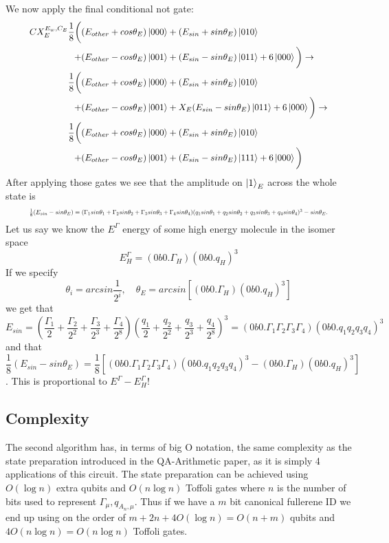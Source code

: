 \documentclass{article}
\begin{document}
\noindent
We now apply the final conditional not gate:
\begin{equation}
   \resizebox{.9\hsize}{!}{$\begin{split}
        CX_{E}^{E_w,C_E}\frac{1}{8}\bigg(
        &(E_{other}+cos\theta_E)\ket{000}+(E_{sin}+sin\theta_E)\ket{010}\\+
        &(E_{other}-cos\theta_E)\ket{001}+(E_{sin}-sin\theta_E)\ket{011}+6\ket{000}\bigg)\to\\
        \frac{1}{8}\bigg(
        &(E_{other}+cos\theta_E)\ket{000}+(E_{sin}+sin\theta_E)\ket{010}\\+
        &(E_{other}-cos\theta_E)\ket{001}+X_{E}(E_{sin}-sin\theta_E)\ket{011}+6\ket{000}\bigg)\to\\
        \frac{1}{8}\bigg(
        &(E_{other}+cos\theta_E)\ket{000}+(E_{sin}+sin\theta_E)\ket{010}\\+
        &(E_{other}-cos\theta_E)\ket{001}+(E_{sin}-sin\theta_E)\ket{111}+6\ket{000}\bigg)\\
   \end{split}$}
\end{equation}
After applying those gates we see that the amplitude on $\ket{1}_{E}$ across the whole state is 
\begin{equation*}
   \resizebox{.9\hsize}{!}{$\frac{1}{8}(E_{sin}-sin\theta_E)=(\Gamma_1sin\theta_1+\Gamma_2sin\theta_2+\Gamma_3sin\theta_3+\Gamma_4sin\theta_4)(q_1sin\theta_1+q_2sin\theta_2+q_3sin\theta_3+q_4sin\theta_4)^3-sin\theta_E.$}
\end{equation*}
Let us say we know the $E^\Gamma$ energy of some high energy molecule in the isomer space $$E^\Gamma_H = (0b0.\Gamma_H)(0b0.q_H)^3$$
If we specify 
$$\theta_i=arcsin\frac{1}{2^i},\quad\theta_E=arcsin[(0b0.\Gamma_H)(0b0.q_H)^3]$$ 
we get that $$E_{sin}=(\frac{\Gamma_1}{2}+\frac{\Gamma_2}{2^2}+\frac{\Gamma_3}{2^3}+\frac{\Gamma_4}{2^8})(\frac{q_1}{2}+\frac{q_2}{2^2}+\frac{q_3}{2^3}+\frac{q_4}{2^8})^3=(0b0.\Gamma_1\Gamma_2\Gamma_3\Gamma_4)(0b0.q_1q_2q_3q_4)^3$$ and that $$\frac{1}{8}(E_{sin}-sin\theta_E)=\frac{1}{8}[(0b0.\Gamma_1\Gamma_2\Gamma_3\Gamma_4)(0b0.q_1q_2q_3q_4)^3-(0b0.\Gamma_H)(0b0.q_H)^3]$$. This is proportional to $E^\Gamma-E^\Gamma_H$! 
\subsection{Complexity}
The second algorithm has, in terms of big O notation, the same complexity as the state preparation introduced in the QA-Arithmetic paper, as it is simply 4 applications of this circuit. The state preparation can be achieved using $O(\log n)$ extra qubits and $O(n\log n)$ Toffoli gates where $n$ is the number of bits used to represent $\varGamma_\mu, q_{A_n,\mu}$. Thus if we have a $m$ bit canonical fullerene ID we end up using on the order of $m+2n+4O(\log n)=O(n+m)$ qubits and $4O(n \log n)=O(n \log n)$ Toffoli gates. 
\end{document}

